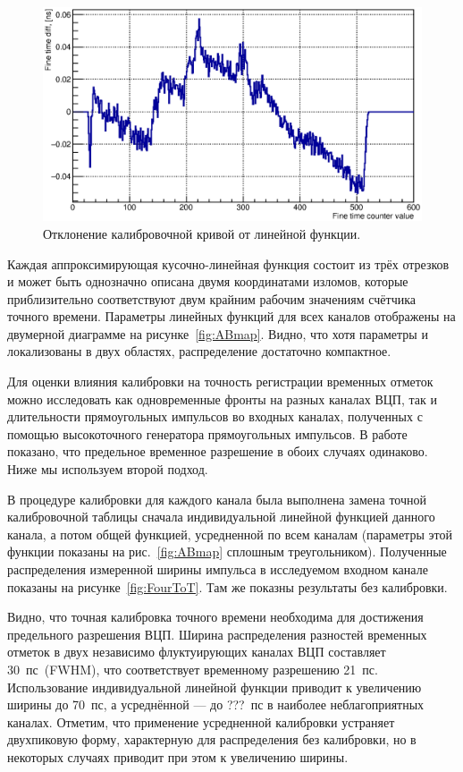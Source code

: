 \begin{figure}
\includegraphics[width=1.0\textwidth]{pictures/CalTableMinusFit_0010_01.eps}
\caption{Отклонение калибровочной кривой от линейной функции.}
\label{fig:CalibTableMinusFit}
\end{figure}

Каждая аппроксимирующая кусочно-линейная функция состоит из трёх отрезков и может быть однозначно описана двумя координатами изломов, которые приблизительно соответствуют двум крайним рабочим значениям счётчика точного времени. Параметры линейных функций для всех каналов отображены на двумерной диаграмме на рисунке~\ref{fig:ABmap}. Видно, что хотя параметры и локализованы в двух областях, распределение достаточно компактное.

Для оценки влияния калибровки на точность регистрации временных отметок можно исследовать как одновременные фронты на разных каналах ВЦП, так и длительности прямоугольных импульсов во входных каналах, полученных с помощью высокоточного генератора прямоугольных импульсов. В работе~\cite{PEPAN} показано, что предельное временное разрешение в обоих случаях одинаково. Ниже мы используем второй подход.

В процедуре калибровки для каждого канала была выполнена замена точной калибровочной таблицы сначала индивидуальной линейной функцией данного канала, а потом общей функцией, усредненной по всем каналам (параметры этой функции показаны на рис.~\ref{fig:ABmap} сплошным треугольником). Полученные распределения измеренной ширины импульса в исследуемом входном канале показаны на рисунке~\ref{fig:FourToT}. Там же показны результаты без калибровки.

Видно, что точная калибровка точного времени необходима для достижения предельного разрешения ВЦП. Ширина распределения разностей временных отметок в двух независимо флуктуирующих каналах ВЦП составляет 30~пс~(FWHM), что соответствует временному разрешению 21~пс. Использование индивидуальной линейной функции приводит к увеличению ширины до 70~пс, а усреднённой --- до ???~пс в наиболее неблагоприятных каналах. Отметим, что применение усредненной калибровки устраняет двухпиковую форму, характерную для распределения без калибровки, но в некоторых случаях приводит при этом к увеличению ширины.

